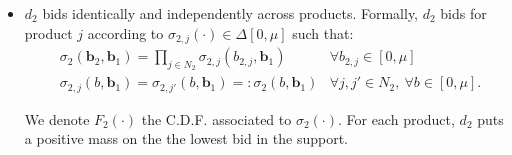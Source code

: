\begin{itemize}
    \noindent We denote $ F_1^{v_H} (b) $ the C.D.F. associated to the distribution $ \sigma_1 (b\ | \ v_H) $. When $t_{1,\iota} = \mu$ for all $\iota \in N_1$ on the other hand, $ d_1 $ bids for product $ \iota $ according to $ \sigma_{1,\iota}(\cdot) \in \Delta[0,\mu] $ such that:

    

    \begin{align*}
    &\sigma_1 (\bm{b}_1 \ |\ t_{1,\iota} = \mu, \ \forall \iota) = \prod_{\iota \in N_1} \sigma_{1,\iota} (b_{1,\iota} \ | \ t_{1,\iota} = \mu ) & \forall b_{1,\iota} \in [0,\mu] \\[5pt]
    &\sigma_{1,\iota} (b \ | \ t_{1,\iota} = \mu) = \sigma_{1,\iota'} (b \ | \ t_{1,\iota'} = \mu) =: \sigma_1 (b \ | \ \mu) & \forall \iota, \iota' \in N_1, \ \forall b \in [0,\mu].
    \end{align*}

    \noindent We denote $ F_1^{\mu} (b) $ the C.D.F. associated to the distribution $ \sigma_1 (b \ | \ \mu) $.

    

    \item $ d_2 $ bids identically and independently across products. Formally, $ d_2 $ bids for product $ j $ according to $ \sigma_{2,j}(\cdot) \in \Delta[0,\mu] $ such that:
    \begin{align*}
    &\sigma_2 (\bm{b}_2, \bm{b}_1) = \prod_{j \in N_2} \sigma_{2,j} (b_{2,j}, \bm{b}_1 ) & \forall b_{2,j} \in [0,\mu] \\[5pt]
    &\sigma_{2,j} (b, \bm{b}_1) = \sigma_{2,j'} (b, \bm{b}_1) =: \sigma_2 (b, \bm{b}_1) & \forall j, j' \in N_2, \ \forall b \in [0,\mu].
    \end{align*}

    \noindent We denote $ F_2 (\cdot) $ the C.D.F. associated to $ \sigma_2 (\cdot) $. For each product, $ d_2 $ puts a positive mass on the the lowest bid in the support.
\end{itemize}

